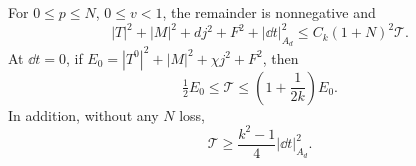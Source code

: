 \begin{lemma}[Coercivity]
\label{alg:coercivity-lemma}
For $0\leq p\leq N$, $0\leq v<1$, the remainder is nonnegative and
\begin{equation}
 |T|^2+|M|^2+dj^2+F^2+|\dd t|_{A_d}^2
 \leq C_k(1+N)^2\mathcal T.
 \label{alg:coercivity}
\end{equation}
At $\dd t=0$, if
$E_0=|T^0|^2+|M|^2+\chi j^2+F^2$, then
\begin{equation}
 \tfrac12E_0\leq\mathcal T\leq
 \left(1+\frac{1}{2k}\right)E_0.
 \label{alg:stationary-coercivity}
\end{equation}
In addition, without any $N$ loss,
\begin{equation}
 \mathcal T\geq\frac{k^2-1}{4}|\dd t|_{A_d}^2.
 \label{alg:gradient-coercivity}
\end{equation}
\end{lemma}

